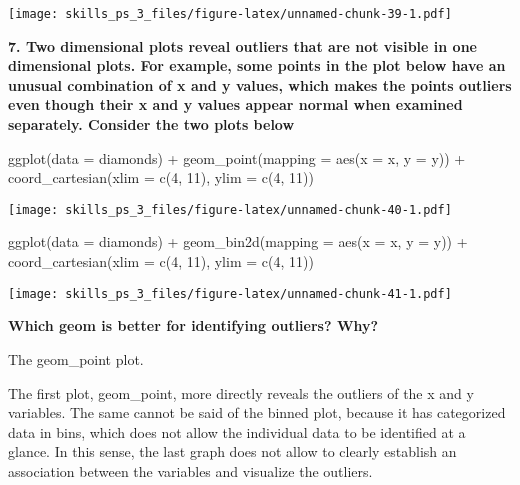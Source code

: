 \documentclass[
]{article}
\newenvironment{Shaded}{\begin{snugshade}}{\end{snugshade}}
\newcommand{\AttributeTok}[1]{\textcolor[rgb]{0.77,0.63,0.00}{#1}}
\newcommand{\DecValTok}[1]{\textcolor[rgb]{0.00,0.00,0.81}{#1}}
\newcommand{\FunctionTok}[1]{\textcolor[rgb]{0.00,0.00,0.00}{#1}}
\newcommand{\NormalTok}[1]{#1}
\newcommand{\SpecialCharTok}[1]{\textcolor[rgb]{0.00,0.00,0.00}{#1}}
\begin{document}
\texttt{[image: skills\_ps\_3\_files/figure-latex/unnamed-chunk-39-1.pdf]}

\textbf{7. Two dimensional plots reveal outliers that are not visible in
one dimensional plots. For example, some points in the plot below have
an unusual combination of x and y values, which makes the points
outliers even though their x and y values appear normal when examined
separately. Consider the two plots below }

\begin{Shaded}
\begin{Highlighting}[]
\FunctionTok{ggplot}\NormalTok{(}\AttributeTok{data =}\NormalTok{ diamonds) }\SpecialCharTok{+}
\FunctionTok{geom\_point}\NormalTok{(}\AttributeTok{mapping =} \FunctionTok{aes}\NormalTok{(}\AttributeTok{x =}\NormalTok{ x, }\AttributeTok{y =}\NormalTok{ y)) }\SpecialCharTok{+}
\FunctionTok{coord\_cartesian}\NormalTok{(}\AttributeTok{xlim =} \FunctionTok{c}\NormalTok{(}\DecValTok{4}\NormalTok{, }\DecValTok{11}\NormalTok{), }\AttributeTok{ylim =} \FunctionTok{c}\NormalTok{(}\DecValTok{4}\NormalTok{, }\DecValTok{11}\NormalTok{))}
\end{Highlighting}
\end{Shaded}

\texttt{[image: skills\_ps\_3\_files/figure-latex/unnamed-chunk-40-1.pdf]}

\begin{Shaded}
\begin{Highlighting}[]
\FunctionTok{ggplot}\NormalTok{(}\AttributeTok{data =}\NormalTok{ diamonds) }\SpecialCharTok{+}
\FunctionTok{geom\_bin2d}\NormalTok{(}\AttributeTok{mapping =} \FunctionTok{aes}\NormalTok{(}\AttributeTok{x =}\NormalTok{ x, }\AttributeTok{y =}\NormalTok{ y)) }\SpecialCharTok{+}
\FunctionTok{coord\_cartesian}\NormalTok{(}\AttributeTok{xlim =} \FunctionTok{c}\NormalTok{(}\DecValTok{4}\NormalTok{, }\DecValTok{11}\NormalTok{), }\AttributeTok{ylim =} \FunctionTok{c}\NormalTok{(}\DecValTok{4}\NormalTok{, }\DecValTok{11}\NormalTok{))}
\end{Highlighting}
\end{Shaded}

\texttt{[image: skills\_ps\_3\_files/figure-latex/unnamed-chunk-41-1.pdf]}

\textbf{Which geom is better for identifying outliers? Why?}

The geom\_point plot.

The first plot, geom\_point, more directly reveals the outliers of the x
and y variables. The same cannot be said of the binned plot, because it
has categorized data in bins, which does not allow the individual data
to be identified at a glance. In this sense, the last graph does not
allow to clearly establish an association between the variables and
visualize the outliers.
\end{document}
